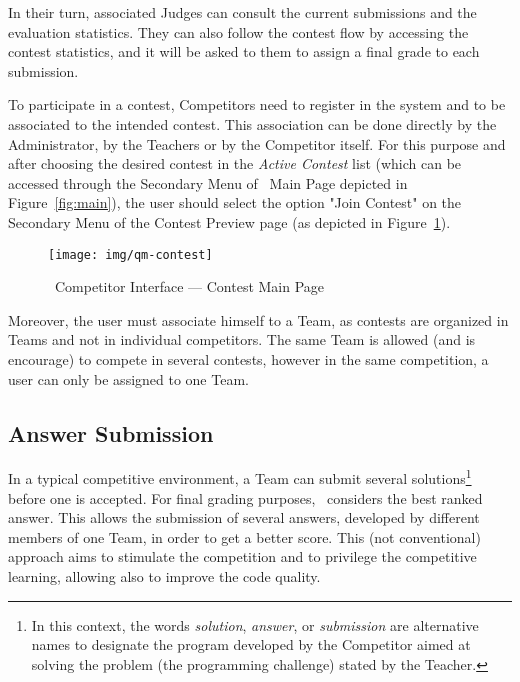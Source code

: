 In their turn, associated \textsf{Judges} can consult the current submissions and the evaluation statistics. They can also follow the contest flow by accessing the contest statistics, and it will be asked to them to assign a final grade to each submission.

To participate in a contest, \textsf{Competitors} need to register in the system and
to be associated to the intended contest.
This association can be done directly by the \textsf{Administrator}, by the \textsf{Teachers} or
by the \textsf{Competitor} itself.
For this purpose and after choosing  the desired contest in the \emph{Active Contest} list (which can be accessed through the Secondary Menu of \quim\ Main Page depicted in Figure~\ref{fig:main}),
the user should select the option "Join Contest" on the Secondary Menu of the Contest Preview page
(as depicted in Figure~\ref{fig:contest}).

\begin{figure}[h]
\begin{center}
\texttt{[image: img/qm-contest]}
\caption{\quim\ \textsf{Competitor} Interface --- Contest Main Page \label{fig:contest}}
\end{center}
\end{figure}


Moreover, the user must associate himself to a \textsf{Team}, as contests are organized in \textsf{Teams} and
not in individual competitors.
The same \textsf{Team} is allowed (and is encourage) to compete in several contests,
however in the same competition, a user can only be assigned to one \textsf{Team}.

\subsection{Answer Submission}

In a typical competitive environment, a \textsf{Team} can submit several solutions\footnote{In this context, the words  \emph{solution}, \emph{answer}, or \emph{submission} are alternative names to designate the program developed by the Competitor aimed at solving the problem (the programming challenge)
stated by the Teacher.} 
before one is accepted.
For final grading purposes, \quim\ considers the best ranked answer.
This allows the submission of several answers, developed by  different members of one \textsf{Team}, in order to get a better score.
This (not conventional) approach aims to stimulate the competition and to privilege the competitive learning,
allowing also to improve the code quality.

